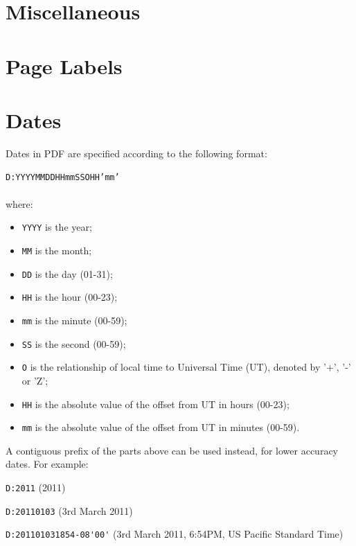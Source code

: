 \documentclass[a4paper]{memoir}
\begin{document}
\chapter{Miscellaneous}
\begin{small}
\end{small}

\chapter{Page Labels}
\begin{small}
\end{small}

\appendix
\chapter{Dates}
\label{dates}
Dates in PDF are specified according to the following format:

\begin{framed}
\texttt{D:YYYYMMDDHHmmSSOHH'mm'}\\\\where:

\begin{itemize}
  \item \texttt{YYYY} is the year;
  \item \texttt{MM} is the month;
  \item \texttt{DD} is the day (01-31);
  \item \texttt{HH} is the hour (00-23);
  \item \texttt{mm} is the minute (00-59);
  \item \texttt{SS} is the second (00-59);
  \item \texttt{O} is the relationship of local time to Universal Time (UT), denoted by '+', '-' or 'Z';
  \item \texttt{HH} is the absolute value of the offset from UT in hours (00-23);
  \item \texttt{mm} is the absolute value of the offset from UT in minutes (00-59).
\end{itemize}
\end{framed}

\noindent A contiguous prefix of the parts above can be used instead, for lower
accuracy dates. For example:

\begin{framed}
   \small\noindent\verb!D:2011! (2011)
   
   \vspace{1.5mm}
   \noindent\verb!D:20110103! (3rd March 2011)

   \vspace{1.5mm}
   \noindent\verb!D:201101031854-08'00'! (3rd March 2011, 6:54PM, US Pacific Standard Time)
   
\end{framed}
\end{document}
